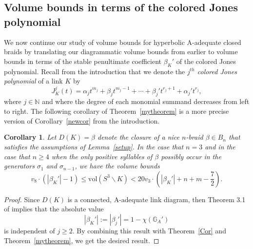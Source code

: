 \documentclass{article}
\newtheorem{corollary}{Corollary}[section]
\begin{document}
\subsection{Volume bounds in terms of the colored Jones polynomial}

We now continue our study of volume bounds for hyperbolic A-adequate closed braids by translating our diagrammatic volume bounds from earlier to volume bounds in terms of the stable penultimate coefficient $\beta_{K}'$ of the colored Jones polynomial. Recall from the introduction that we denote the \emph{$j^{th}$ colored Jones polynomial} of a link $K$ by
$$J_{K}^{j}(t)=\alpha_{j}t^{m_{j}}+\beta_{j}t^{m_{j}-1}+\cdots+\beta_{j}'t^{r_{j}+1}+\alpha_{j}'t^{r_{j}},$$
\noindent where $j \in \mathbb{N}$ and where the degree of each monomial summand decreases from left to right. The following corollary of Theorem~\ref{mytheorem} is a more precise version of Corollary~\ref{newcor} from the introduction.
 
\begin{corollary} 
\label{newestsetup}
Let $D(K)=\widehat{\beta}$ denote the closure of a nice $n$-braid $\beta \in B_{n}$ that satisfies the assumptions of Lemma~\ref{setup}. In the case that $n=3$ and in the case that $n \geq 4$ when the only positive syllables of $\beta$ possibly occur in the generators $\sigma_{1}$ and $\sigma_{n-1}$, we have the volume bounds 
$$v_{8}\cdot(\left|\beta_{K}'\right|-1) \leq \mathrm{vol}(S^{3}\backslash K) < 20v_{3}\cdot\left(\left|\beta_{K}'\right|+n+m-\dfrac{7}{2}\right).$$
\end{corollary}

\begin{proof} Since $D(K)$ is a connected, A-adequate link diagram, then Theorem 3.1 of \cite{HeadTail} implies that the absolute value $$\left|\beta_{K}'\right|:=\left|\beta_{j}'\right|=1-\chi(\mathbb{G}_{A}')$$ is independent of $j \geq 2$. By combining this result with Theorem~\ref{Cor} and Theorem~\ref{mytheorem}, we get the desired result. 
\end{proof}
\end{document}
